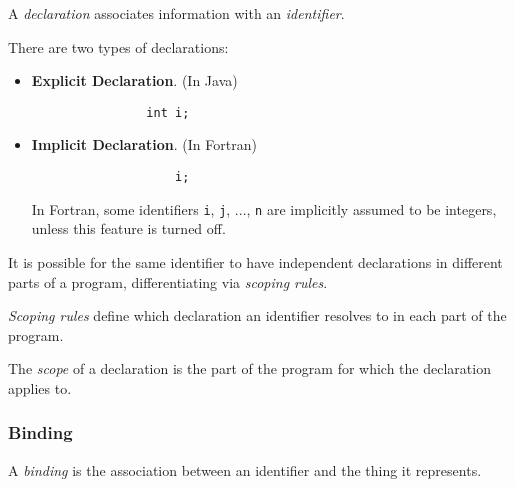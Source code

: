 \begin{definition}[Declaration]
    A \textit{declaration} associates information with an \textit{identifier}.
    
    There are two types of declarations:
    \begin{itemize}[itemsep=4pt, parsep=4pt, topsep=8pt, partopsep=4pt]
        \item \textbf{Explicit Declaration}. (In Java) 
            \begin{verbatim}
                int i;
            \end{verbatim}
        \item \textbf{Implicit Declaration}. (In Fortran)
            \begin{verbatim}
                    i;
            \end{verbatim}
            In Fortran, some identifiers \texttt{i}, \texttt{j}, ..., \texttt{n} are implicitly assumed to be integers, unless this feature is turned off.
    \end{itemize}
    
    It is possible for the same identifier to have independent declarations in different parts of a program, differentiating via \textit{scoping rules}.
\end{definition}

\begin{definition}
    \textit{Scoping rules} define which declaration an identifier resolves to in each part of the program.
\end{definition}

\begin{definition}[Scope]
    The \textit{scope} of a declaration is the part of the program for which the declaration applies to.
\end{definition}

\subsubsection{Binding}

\begin{definition}[Binding]
    A \textit{binding} is the association between an identifier and the thing it represents.
\end{definition}


